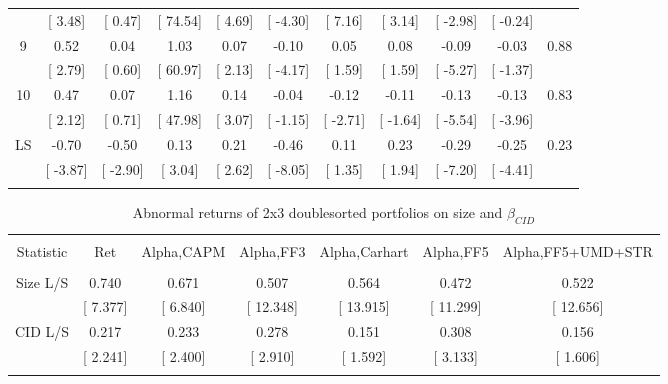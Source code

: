 \documentclass[16pt]{article}
\begin{document}
\begin{table}[!htbp]
\begin{tabular}{@{\extracolsep{5pt}} ccccccccccc}
 & [ 3.48] & [ 0.47] & [ 74.54] & [ 4.69] & [ -4.30] & [ 7.16] & [ 3.14] & [ -2.98] & [ -0.24] &  \\ 
9 & 0.52 & 0.04 & 1.03 & 0.07 & -0.10 & 0.05 & 0.08 & -0.09 & -0.03 & 0.88 \\ 
 & [ 2.79] & [ 0.60] & [ 60.97] & [ 2.13] & [ -4.17] & [ 1.59] & [ 1.59] & [ -5.27] & [ -1.37] &  \\ 
10 & 0.47 & 0.07 & 1.16 & 0.14 & -0.04 & -0.12 & -0.11 & -0.13 & -0.13 & 0.83 \\ 
 & [ 2.12] & [ 0.71] & [ 47.98] & [ 3.07] & [ -1.15] & [ -2.71] & [ -1.64] & [ -5.54] & [ -3.96] &  \\ 
LS & -0.70 & -0.50 & 0.13 & 0.21 & -0.46 & 0.11 & 0.23 & -0.29 & -0.25 & 0.23 \\ 
 & [ -3.87] & [ -2.90] & [ 3.04] & [ 2.62] & [ -8.05] & [ 1.35] & [ 1.94] & [ -7.20] & [ -4.41] &  \\ 
\hline \\[-1.8ex] 
\end{tabular} 
\end{table}



\begin{table}[!htbp] \centering 
  \caption{Abnormal returns of 2x3 doublesorted portfolios on size and $\beta_{CID}$} 
  \label{} 
\begin{tabular}{@{\extracolsep{5pt}} ccccccc} 
\\[-1.8ex]\hline 
\hline \\[-1.8ex] 
Statistic & Ret & Alpha,CAPM & Alpha,FF3 & Alpha,Carhart & Alpha,FF5 & Alpha,FF5+UMD+STR \\ 
\hline \\[-1.8ex] 
Size L/S & 0.740 & 0.671 & 0.507 & 0.564 & 0.472 & 0.522 \\ 
 & [ 7.377] & [ 6.840] & [ 12.348] & [ 13.915] & [ 11.299] & [ 12.656] \\ 
CID L/S & 0.217 & 0.233 & 0.278 & 0.151 & 0.308 & 0.156 \\ 
 & [ 2.241] & [ 2.400] & [ 2.910] & [ 1.592] & [ 3.133] & [ 1.606] \\ 
\hline \\[-1.8ex] 
\end{tabular} 
\end{table}
\end{document}
